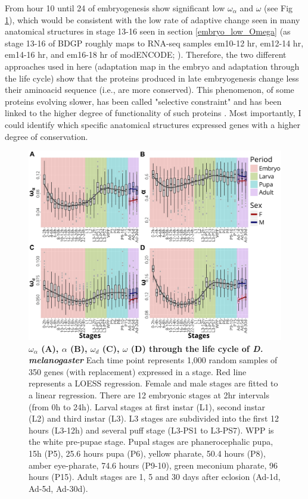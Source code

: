 From hour 10 until 24 of embryogenesis show significant low $\omega_{\alpha}$ and $\omega$ (see Fig \ref{fig:Art-IV-OmegaA_lifecycle}), which would be consistent with the low rate of adaptive change seen in many anatomical structures in stage 13-16 seen in section \ref{embryo_low_Omega} (as stage 13-16 of BDGP roughly maps to RNA-seq samples em10-12 hr, em12-14 hr, em14-16 hr, and em16-18 hr of modENCODE; \citealp{Hammonds2013}).
Therefore, the two different approaches used in here (adaptation map in the embryo and adaptation through the life cycle) show that the proteins produced in late embryogenesis change less their aminoacid sequence (i.e., are more conserved). 
This phenomenon, of some proteins evolving slower, has been called "selective constraint" and has been linked to the higher degree of functionality of such proteins \citep{kimura1983neutral}.
Most importantly, I could identify which specific anatomical structures expressed genes with a higher degree of conservation.

\begin{figure}[t]
  \includegraphics[width=\textwidth]{./Images/Art-IV/OmegaA_lifecycle.png}
  \centering
  \caption{\textbf{ {\large$\omega_{\alpha}$} (A),  {\large$\alpha$} (B), {\large$\omega_{d}$} (C), {\large$\omega$} (D) through the life cycle of \textit{D. melanogaster}} Each time point represents 1,000 random samples of 350 genes (with replacement) expressed in a stage. Red line represents a LOESS regression. Female and male stages are fitted to a linear regression. There are 12 embryonic stages at 2hr intervals (from 0h to 24h). Larval stages at first instar (L1), second instar (L2) and third instar (L3). L3 stages are subdivided into the first 12 hours (L3-12h) and several puff stage (L3-PS1 to L3-PS7). WPP is the white pre-pupae stage. Pupal stages are phanerocephalic pupa, 15h (P5), 25.6 hours pupa (P6), yellow pharate, 50.4 hours (P8), amber eye-pharate, 74.6 hours (P9-10), green meconium pharate, 96 hours (P15). Adult stages are 1, 5 and 30 days after eclosion (Ad-1d, Ad-5d, Ad-30d).
  }
  \label{fig:Art-IV-OmegaA_lifecycle}
\end{figure}

